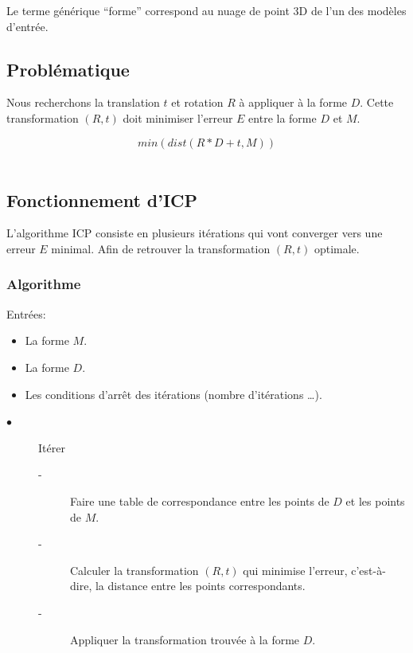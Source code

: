 \documentclass[a4paper,11pt]{article}
\begin{document}
Le terme générique ``forme'' correspond au nuage de point 3D de l'un des 
modèles d'entrée.\\

\subsection{Problématique}

Nous recherchons la translation $t$ et rotation $R$ à appliquer à la 
forme $D$. Cette transformation $(R,t)$ doit minimiser l'erreur $E$ 
entre la forme $D$ et $M$.

$$
min(dist(R*D+t,M))
$$
\\

\subsection{Fonctionnement d'ICP}

L'algorithme ICP consiste en plusieurs itérations qui vont converger 
vers une erreur $E$ minimal. Afin de retrouver la transformation $(R,t)$ 
optimale.\\

\subsubsection{Algorithme}

Entrées:
\begin{itemize}
  \item La forme $M$.
  \item La forme $D$.
  \item Les conditions d'arrêt des itérations (nombre d'itérations 
  \ldots).\\
\end{itemize}

\begin{description}
  \item[$\bullet$]Itérer
  \begin{description}
     \item[-] Faire une table de correspondance entre les points de $D$ 
     et les points de $M$.
     \item[-] Calculer la transformation $(R,t)$ qui minimise l'erreur, 
     c'est-à-dire, la distance entre les points correspondants.
     \item[-] Appliquer la transformation trouvée à la forme $D$.\\
   \end{description} 
\end{description}
\end{document}
